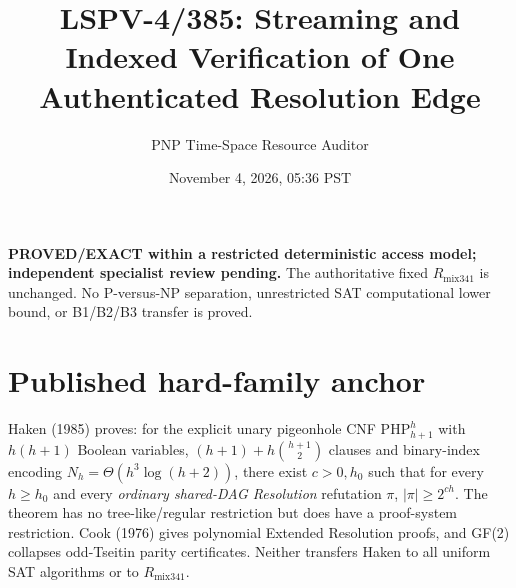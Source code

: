 \documentclass[11pt]{article}
\title{LSPV-4/385: Streaming and Indexed Verification of One Authenticated Resolution Edge}
\author{PNP Time-Space Resource Auditor}
\date{November 4, 2026, 05:36 PST}
\begin{document}
\maketitle
\noindent\textbf{PROVED/EXACT within a restricted deterministic access model; independent specialist review pending.}
The authoritative fixed $R_{\mathrm{mix341}}$ is unchanged. No P-versus-NP separation, unrestricted SAT computational lower bound, or B1/B2/B3 transfer is proved.
\section*{Published hard-family anchor}
Haken (1985) proves: for the explicit unary pigeonhole CNF $\mathrm{PHP}_{h+1}^{h}$ with $h(h+1)$ Boolean variables, $(h+1)+h\binom{h+1}{2}$ clauses and binary-index encoding $N_h=\Theta(h^3\log(h+2))$, there exist $c>0,h_0$ such that for every $h\ge h_0$ and every \emph{ordinary shared-DAG Resolution} refutation $\pi$, $|\pi|\ge2^{ch}$. The theorem has no tree-like/regular restriction but does have a proof-system restriction. Cook (1976) gives polynomial Extended Resolution proofs, and GF(2) collapses odd-Tseitin parity certificates. Neither transfers Haken to all uniform SAT algorithms or to $R_{\mathrm{mix341}}$.
\end{document}
